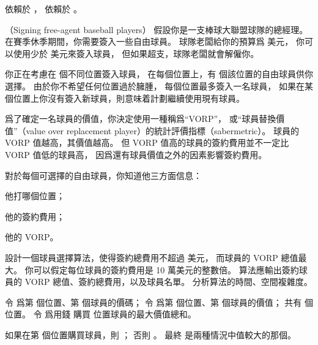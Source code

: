  依賴於 ，  依賴於 。
\stopANSWER

\startPROBLEM
（Signing free-agent baseball players）
假設你是一支棒球大聯盟球隊的總經理。
在賽季休季期間，你需要簽入一些自由球員。
球隊老闆給你的預算爲  美元，
你可以使用少於  美元來簽入球員，
但如果超支，球隊老闆就會解僱你。

你正在考慮在  個不同位置簽入球員，
在每個位置上，有  個該位置的自由球員供你選擇。
由於你不希望任何位置過於臃腫，
每個位置最多簽入一名球員，
如果在某個位置上你沒有簽入新球員，則意味着計劃繼續使用現有球員。

爲了確定一名球員的價值，你決定使用一種稱爲“VORP”，
或“球員替換價值”（value over replacement player）的統計評價指標（sabermetric）。
球員的 VORP 值越高，其價值越高。
但 VORP 值高的球員的簽約費用並不一定比 VORP 值低的球員高，
因爲還有球員價值之外的因素影響簽約費用。

對於每個可選擇的自由球員，你知道他三方面信息：
\startigBase
\item 他打哪個位置；
\item 他的簽約費用；
\item 他的 VORP。
\stopigBase

設計一個球員選擇算法，使得簽約總費用不超過  美元，
而球員的 VORP 總值最大。
你可以假定每位球員的簽約費用是 10 萬美元的整數倍。
算法應輸出簽約球員的 VORP 總值、簽約總費用，以及球員名單。
分析算法的時間、空間複雜度。
\stopPROBLEM

\startANSWER
令  爲第  個位置、第  個球員的價碼；
令  爲第  個位置、第  個球員的價值；
共有  個位置。
令  爲用錢  購買  位置球員的最大價值總和。

如果在第  個位置購買球員，則 ；
否則 。
最終  是兩種情況中值較大的那個。
\stopANSWER

\stopsubject%
